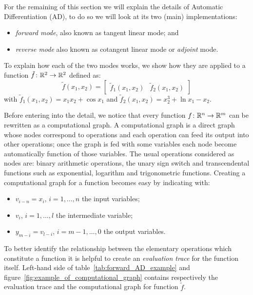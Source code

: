 For the remaining of this section we will explain the details of Automatic Differentiation (AD), to do so we will look at its two (main) implementations:
\begin{itemize}
	\item \emph{forward mode}, also known as tangent linear mode; and
	\item \emph{reverse mode} also known as cotangent linear mode or \emph{adjoint} mode.
\end{itemize}
To explain how each of the two modes works, we show how they are applied to a function $\tilde{f} \colon \mathbb{R}^2 \to \mathbb{R}^2$ defined as:
\begin{equation}
	\label{eqn:example_function_for_AD}
	\tilde{f}(x_1, x_2) = \begin{bmatrix}
					\tilde{f}_1(x_1, x_2)  &  \tilde{f}_2(x_1, x_2)
				  \end{bmatrix}
\end{equation}
with $\tilde{f}_1(x_1, x_2) = x_1 x_2 + \cos x_1$ and $\tilde{f}_2(x_1, x_2) = x_2^3 + \ln x_1 - x_2$.

\smallskip
Before entering into the detail, we notice that every function $f \colon \mathbb{R}^n \to \mathbb{R}^m$ can be rewritten as a computational graph. A computational graph is a direct graph whose nodes correspond to operations and each operation can feed its output into other operations; once the graph is fed with some variables each node become automatically function of those variables. The usual operations considered as nodes are: binary arithmetic operations, the unary sign switch and transcendental functions such as exponential, logarithm and trigonometric functions.
Creating a computational graph for a function becomes easy by indicating with:
\begin{itemize}
	\item $v_{i-n}=x_i$, $i=1, \dots, n$ the input variables;
	\item $v_i$, $i=1, \dots, l$ the intermediate variable;
	\item $y_{m-i}=v_{l-i}$, $i=m-1, \dots, 0$ the output variables.
\end{itemize}
To better identify the relationship between the elementary operations which constitute a function it is helpful to create an \emph{evaluation trace} for the function itself.
Left-hand side of table~\ref{tab:forward_AD_example} and figure~\ref{fig:example_of_computational_graph} contains respectively the evaluation trace and the computational graph for function $\tilde{f}$.

